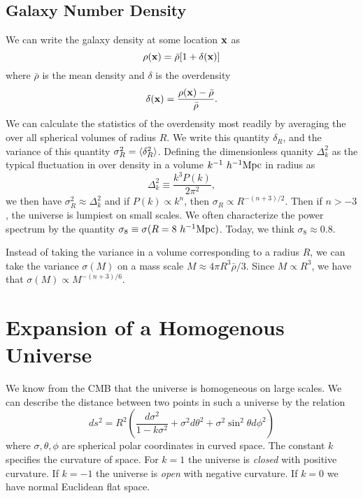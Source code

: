 \documentclass[]{article}
\begin{document}
\subsection{Galaxy Number Density}

We can write the galaxy density at some location $\mathbf{x}$ as
\begin{equation}
\rho(\mathbf{x}) = \bar{\rho}[1+\delta(\mathbf{x})]
\end{equation}
\noindent
where $\bar{\rho}$ is the mean density and $\delta$ is the overdensity
\begin{equation}
\delta(\mathbf{x}) = \frac{\rho(\mathbf{x}) - \bar{\rho}}{\bar{\rho}}.
\end{equation}
We can calculate the statistics of the overdensity most readily
by averaging the over all spherical volumes of radius $R$.
We write this quantity $\delta_R$, and the variance of 
this quantity $\sigma_R^2 = \langle\delta_R^2\rangle$.  Defining
the dimensionless quanity $\Delta_k^2$ as the typical
fluctuation in over density in a volume $k^{-1}~h^{-1}\mathrm{Mpc}$
in radius as
\begin{equation}
\Delta_k^2 \equiv \frac{k^3 P(k)}{2\pi^2},
\end{equation}
\noindent
we then have $\sigma_R^2 \approx \Delta_k^2$ and if
$P(k)\propto k^n$, then $\sigma_R \propto R^{-(n+3)/2}$.
Then if $n>-3$, the universe is lumpiest on small scales.
We often characterize the power spectrum by the 
quantity $\sigma_8\equiv\sigma(R=8~h^{-1}\mathrm{Mpc})$.  Today, we think 
$\sigma_8\approx0.8$.

Instead of taking the variance in a volume corresponding to
a radius $R$, we can take the variance $\sigma(M)$ on a mass scale
$M \approx 4\pi R^3  \bar{\rho}/3$.  Since $M \propto R^3$, we
have that $\sigma(M) \propto M^{-(n+3)/6}$.

\section{Expansion of a Homogenous Universe}

We know from the CMB that the universe is homogeneous on
large scales.  We can describe the distance between two
points in such a universe by the relation
\begin{equation}
ds^2 = R^2 \left( \frac{d\sigma^2}{1-k\sigma^2} + \sigma^2 d\theta^2 + \sigma^2 \sin^2 \theta d\phi^2\right)
\end{equation}
\noindent
where $\sigma, \theta, \phi$ are spherical polar coordinates in curved space.
The constant $k$ specifies the curvature of space.  For $k=1$ the universe
is {\it closed} with positive curvature.  If $k=-1$ the universe is
{\it open} with negative curvature.  If $k=0$ we have normal Euclidean
flat space.
\end{document}
